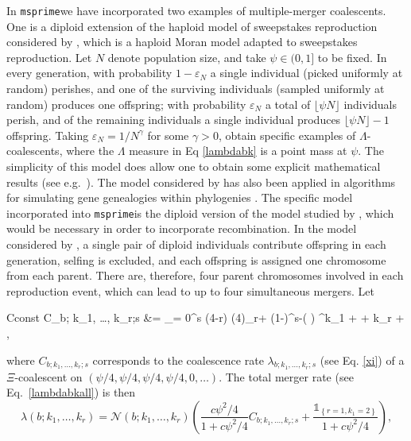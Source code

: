 \documentclass{article}
\newcommand{\msprime}[0]{\texttt{msprime}}
\newcommand{\be}{\begin{equation}}
\newcommand{\ee}{\end{equation}}
\newcommand{\one}[1]{\ensuremath{\mathds{1}_{\left\{ #1 \right\}}}}%
\begin{document}
In \msprime we have incorporated two examples of multiple-merger
coalescents.  One is a diploid extension \citep{BBE13} of the haploid
model of sweepstakes reproduction considered by \cite{EW06}, which is
a haploid Moran model adapted to sweepstakes reproduction.  Let $N$
denote population size, and take $\psi \in (0,1]$ to be fixed.  In
every generation, with probability $1-\varepsilon_N$ a single
individual (picked uniformly at random) perishes, and one of the
surviving individuals (sampled uniformly at random) produces one
offspring; with probability $\varepsilon_N$ a total of
$\lfloor \psi N \rfloor$ individuals perish, and of the remaining
individuals a single individual produces $\lfloor \psi N \rfloor -1 $
offspring.  Taking $\varepsilon_N = 1/N^\gamma$ for some $\gamma > 0$,
\cite{EW06} obtain specific examples of $\Lambda$-coalescents, where
the $\Lambda$ measure in Eq \eqref{lambdabk} is a point mass at
$\psi$.  The simplicity of this model does allow one to obtain some
explicit mathematical results (see e.g.\
\cite{EF2018,Matuszewski2017,Der2012,Freund2020}). The model
considered by \cite{EW06} has also been applied in algorithms for
simulating gene genealogies within phylogenies \citep{zhu2015hybrid}. The
 specific model incorporated into \msprime is the diploid version
\citep{BBE13} of the model studied by \cite{EW06}, which would be
necessary in order to incorporate recombination.  In the model
considered by \cite{BBE13}, a single pair of diploid individuals
contribute offspring in each generation, selfing is excluded, and each
offspring is assigned one chromosome from each parent. There are,
therefore, four parent chromosomes involved in each reproduction
event, which can lead to up to four simultaneous mergers.  Let
\begin{esplit}{Cconst}
C_{b; k_1, \ldots, k_r;s } &=   \sum_{\ell = 0}^{s \wedge (4-r)}  (4)_{r+\ell} (1-\psi)^{s-\ell }\left(  \right) ^{k_1 + \cdots + k_r + \ell},  \\
\end{esplit}
where  $C_{b; k_1, \ldots, k_r;s }$ corresponds to the coalescence rate $ \lambda_{b;k_1, \ldots, k_r;s}$ (see Eq. \eqref{xi}) of a  $\Xi$-coalescent on  $(\psi/4, \psi/4, \psi/4, \psi/4, 0, \ldots)$.
The total merger rate (see Eq.\ \eqref{lambdabkall}) is then
\be\label{xidirlambdabk}
      \lambda(b;k_1, \ldots, k_r) =    \mathcal{N}(b; k_1, \ldots, k_r ) \left( \frac{c\psi^2/4}{1 +  c\psi^2/4}C_{b; k_1, \ldots, k_r;s } +     \frac{ \one{r=1, k_1 = 2} }{1 +  c\psi^2/4}  \right),
\ee
\end{document}
